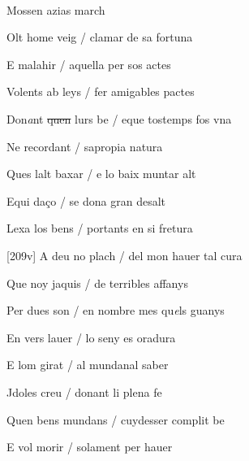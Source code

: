 \documentclass[12pt]{article}
\renewcommand{\espaiAbansEtiquetaPoema}{\vspace{0ex}}
\begin{document}
\begin{estrofa}

\espaiAbansEtiquetaPoema

\\

\begin{rubrica}

Mossen azias march \clauTancada

\end{rubrica}

\end{estrofa}


\begin{estrofa}

 Olt home veig / clamar de sa fortuna

 E malahir / aquella per sos actes

 Volents ab leys / fer amigables pactes

 Don\textit{a}nt \sout{quen} lurs be / eque tostemps fos vna

 Ne recordant / sapropia natura

 Ques lalt baxar / e lo baix muntar alt

 Equi da\c{c}o / se dona gran desalt

 Lexa los bens / portants en si fretura

\end{estrofa}



\begin{estrofa}

 [209v] A deu no plach / del mon hauer tal cura

 Que noy jaquis / de terribles affanys

 Per dues son / en nombre mes qu\textit{e}ls guanys

 En vers lauer / lo seny es oradura

 E lom girat / al mundanal saber

 Jdoles creu / donant li plena fe

 Quen bens mundans / cuydesser complit be

 E vol morir / solament per hauer

\end{estrofa}
\end{document}
